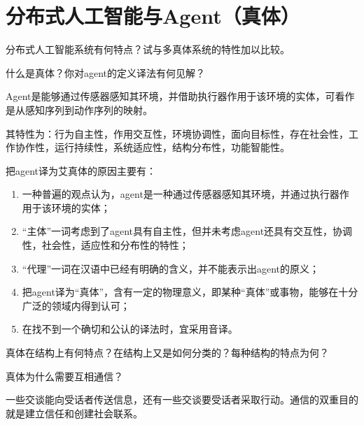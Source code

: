 \chapter{分布式人工智能与Agent（真体）}

\begin{question}
分布式人工智能系统有何特点？试与多真体系统的特性加以比较。  
\end{question}
\begin{solution}
\end{solution}

\begin{question}
什么是真体？你对agent的定义译法有何见解？
\end{question}
\begin{solution}
Agent是能够通过传感器感知其环境，并借助执行器作用于该环境的实体，可看作是从感知序列到动作序列的映射。\par
其特性为：行为自主性，作用交互性，环境协调性，面向目标性，存在社会性，工作协作性，运行持续性，系统适应性，结构分布性，功能智能性。\par  
把agent译为艾真体的原因主要有：
	\begin{enumerate}
	\item 一种普遍的观点认为，agent是一种通过传感器感知其环境，并通过执行器作用于该环境的实体；
	\item ``主体''一词考虑到了agent具有自主性，但并未考虑agent还具有交互性，协调性，社会性，适应性和分布性的特性；
	\item ``代理''一词在汉语中已经有明确的含义，并不能表示出agent的原义；
	\item 把agent译为``真体''，含有一定的物理意义，即某种``真体''或事物，能够在十分广泛的领域内得到认可；
	\item 在找不到一个确切和公认的译法时，宜采用音译。
	\end{enumerate}
\end{solution}

\begin{question}
真体在结构上有何特点？在结构上又是如何分类的？每种结构的特点为何？  
\end{question}
\begin{solution}
\end{solution}

\begin{question}
真体为什么需要互相通信？
\end{question}
\begin{solution}
一些交谈能向受话者传送信息，还有一些交谈要受话者采取行动。通信的双重目的就是建立信任和创建社会联系。  
\end{solution}

